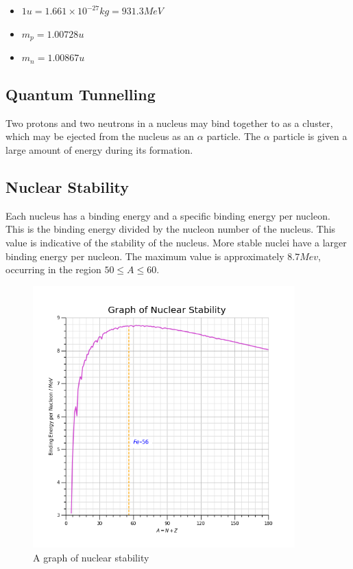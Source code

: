 \documentclass[12pt]{article}
\begin{document}
\begin{itemize}
\item \(1u = 1.661 \times 10^{-27}kg= 931.3MeV\)
\item \(m_p = 1.00728u\)
\item \(m_n = 1.00867u\)
\end{itemize}

\subsection{Quantum Tunnelling}
\label{sec:org2b42eb3}

Two protons and two neutrons in a nucleus may bind together to as a cluster, which may be ejected from the nucleus as an \(\alpha\) particle. The \(\alpha\) particle is given a large amount of energy during its formation.

\subsection{Nuclear Stability}
\label{sec:orgea5c069}

Each nucleus has a binding energy and a specific binding energy per nucleon. This is the binding energy divided by the nucleon number of the nucleus. This value is indicative of the stability of the nucleus. More stable nuclei have a larger binding energy per nucleon. The maximum value is approximately \(8.7Mev\), occurring in the region \(50 \le A \le 60\).

\begin{figure}[H]
\centering
\includegraphics[width=0.9\textwidth,keepaspectratio]{./images/nuclear_stability.png}
\caption{A graph of nuclear stability}
\end{figure}
\end{document}
